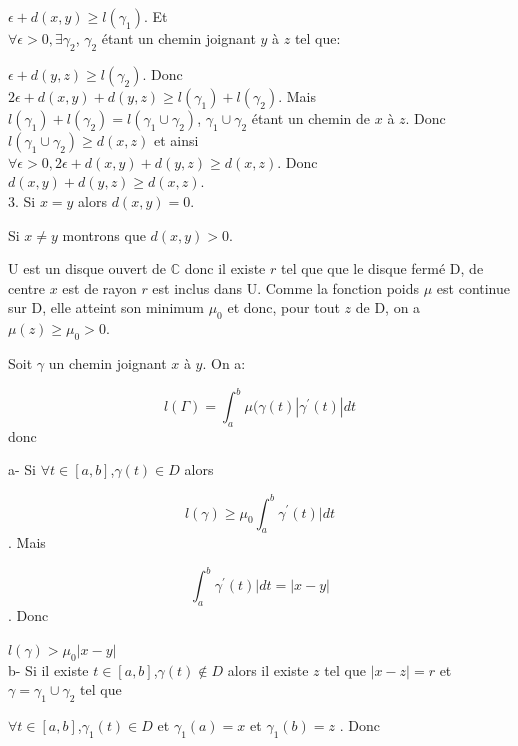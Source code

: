 \documentclass[a4paper, 12pt, twoside]{book}
\begin{document}
  $\epsilon+d(x, y)\geq l(\gamma_{1})$. Et\\
  
  $\forall \epsilon>0, \exists \gamma_{2}$,  $\gamma_{2}$ étant un chemin joignant $y$ à $z$ tel que:\
 
  $\epsilon+d(y, z)\geq l(\gamma_{2})$. Donc\\
  
 
  $ 2\epsilon+d(x, y)+d(y, z)\geq l(\gamma_{1})+l(\gamma_{2})$. Mais\\
  
 $l(\gamma_{1})+l(\gamma_{2})=l(\gamma_{1}\cup\gamma_{2})  $, $\gamma_{1}\cup\gamma_{2} $ étant un chemin de $x$ à $z$. Donc\\
 
$ l(\gamma_{1}\cup\gamma_{2})\geq d(x,z)$ et ainsi\\

 $\forall \epsilon>0, 2\epsilon+d(x,y)+d(y,z)\geq d(x,z)$. Donc\\
 
   
  $d(x,y)+d(y,z)\geq d(x,z)$.\\
  
  3. Si $x=y$ alors $d(x,y)=0$.\
  
  Si $x\neq y$ montrons que $d(x,y)>0$.\
  
  U est un disque ouvert de $\mathbb{C}$ donc il existe $r$ tel que que le disque fermé D, de centre $x$ est de rayon $r$ est inclus dans U. Comme la fonction poids $\mu$ est continue sur D, elle atteint son minimum $\mu_{0}$ et donc,  pour tout $z$ de D, on a $\mu(z)\geq \mu_{0}>0$.\
  
  Soit $\gamma$ un chemin joignant $x$ à $y$. On a:\
  
   $$l(\Gamma)=\int_{a}^{b} \mu(\gamma(t)|\gamma^{'}(t)|dt$$ donc\
   
   a-  Si $\forall t\in [a, b]$,$ \gamma(t)\in D$ alors\
   
   $$l(\gamma)\geq \mu_{0}\int_{a}^{b}\gamma^{'}(t)|dt$$. Mais\
   
   
  $$\int_{a}^{b}\gamma^{'}(t)|dt=|x-y|$$. Donc\
  
   $l(\gamma)>\mu_{0}|x-y|$\\
   
   b- Si il existe $t\in [a, b]$,$ \gamma(t)\notin D$ alors il existe $z$ tel que $|x-z|=r$ et $\gamma=\gamma_{1}\cup \gamma_{2}$ tel que\
   
    $\forall t\in [a, b]$,$\gamma_{1}(t)\in D$ et $\gamma_{1}(a)=x$ et $\gamma_{1}(b)=z$  . Donc\
   
\end{document}

